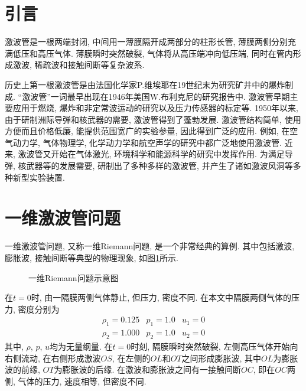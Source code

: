 \documentclass[a4paper,boxed]{caspset}
\begin{document}

\section{引言}
激波管是一根两端封闭, 中间用一薄膜隔开成两部分的柱形长管, 薄膜两侧分别充满低压和高压气体. 薄膜瞬时突然破裂, 气体将从高压端冲向低压端, 同时在管内形成激波, 稀疏波和接触间断等复杂波系.

历史上第一根激波管是由法国化学家P.维埃耶在19世纪末为研究矿井中的爆炸制成. ``激波管''一词最早出现在1946年美国W.布利克尼的研究报告中. 激波管早期主要应用于燃烧, 爆炸和非定常波运动的研究以及压力传感器的标定等. 1950年以来, 由于研制洲际导弹和核武器的需要, 激波管得到了蓬勃发展. 激波管结构简单, 使用方便而且价格低廉, 能提供范围宽广的实验参量, 因此得到广泛的应用. 例如, 在空气动力学, 气体物理学, 化学动力学和航空声学的研究中都广泛地使用激波管. 近来, 激波管又开始在气体激光, 环境科学和能源科学的研究中发挥作用. 为满足导弹, 核武器等的发展需要, 研制出了多种多样的激波管, 并产生了诸如激波风洞等多种新型实验装置.

\section{一维激波管问题}
一维激波管问题, 又称一维Riemann问题, 是一个非常经典的算例. 其中包括激波, 膨胀波, 接触间断等典型的物理现象, 如图\ref{1DRiemann}所示.
\begin{figure}[!htb]
\centering

\caption{\label{1DRiemann}一维Riemann问题示意图}
\end{figure}
在$t=0$时, 由一隔膜两侧气体静止, 但压力, 密度不同. 在本文中隔膜两侧气体的压力, 密度分别为
\[
\begin{array}{ccc}
  \rho_1 = 0.125 & p_1 = 1.0 & u_1 = 0 \\
  \rho_2 = 1.000 & p_2 = 1.0 & u_2 = 0
\end{array}
\]
其中, $\rho$, $p$, $u$均为无量纲量. 在$t=0$时刻, 隔膜瞬时突然破裂, 左侧高压气体开始向右侧流动, 在右侧形成激波$OS$, 在左侧的$OL$和$OT$之间形成膨胀波, 其中$OL$为膨胀波的前缘, $OT$为膨胀波的后缘. 在激波和膨胀波之间有一接触间断$OC$, 即在$OC$两侧, 气体的压力, 速度相等, 但密度不同.
\end{document}
